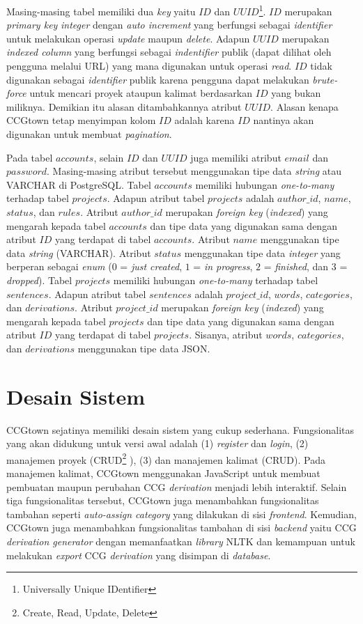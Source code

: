 Masing-masing tabel memiliki dua \textit{key} yaitu $ID$ dan
$UUID$\footnote{Universally Unique IDentifier}.
$ID$ merupakan \textit{primary key} \textit{integer} dengan \textit{auto increment}
yang berfungsi sebagai \textit{identifier} untuk melakukan operasi
\textit{update} maupun \textit{delete}.
Adapun $UUID$ merupakan \textit{indexed column} yang berfungsi sebagai
\textit{indentifier} publik (dapat dilihat oleh pengguna melalui URL)
yang mana digunakan untuk operasi \textit{read}.
$ID$ tidak digunakan sebagai \textit{identifier} publik karena pengguna dapat
melakukan \textit{brute-force} untuk mencari proyek ataupun kalimat berdasarkan
$ID$ yang bukan miliknya.
Demikian itu alasan ditambahkannya atribut $UUID$.
Alasan kenapa CCGtown tetap menyimpan kolom $ID$ adalah karena $ID$ nantinya akan
digunakan untuk membuat \textit{pagination}.

Pada tabel $accounts$, selain $ID$ dan $UUID$ juga memiliki atribut $email$ dan
$password$. Masing-masing atribut tersebut menggunakan tipe data \textit{string}
atau VARCHAR di PostgreSQL.
Tabel $accounts$ memiliki hubungan \textit{one-to-many} terhadap tabel $projects$.
Adapun atribut tabel $projects$ adalah $author\_id$, $name$, $status$, dan $rules$.
Atribut $author\_id$ merupakan \textit{foreign key} (\textit{indexed}) yang
mengarah kepada tabel $accounts$ dan tipe data yang digunakan sama dengan
atribut $ID$ yang terdapat di tabel $accounts$.
Atribut $name$ menggunakan tipe data \textit{string} (VARCHAR).
Atribut $status$ menggunakan tipe data \textit{integer} yang berperan sebagai
\textit{enum} ($0$ = \textit{just created}, $1$ = \textit{in progress},
$2$ = \textit{finished}, dan $3$ = \textit{dropped}).
Tabel $projects$ memiliki hubungan \textit{one-to-many} terhadap tabel $sentences$.
Adapun atribut tabel $sentences$ adalah $project\_id$, $words$, $categories$, dan
$derivations$. Atribut $project\_id$ merupakan \textit{foreign key}
(\textit{indexed}) yang mengarah kepada tabel $projects$ dan tipe data yang digunakan
sama dengan atribut $ID$ yang terdapat di tabel $projects$.
Sisanya, atribut $words$, $categories$, dan $derivations$ menggunakan tipe data JSON.


\section{Desain Sistem}
CCGtown sejatinya memiliki desain sistem yang cukup sederhana.
Fungsionalitas yang akan didukung untuk versi awal adalah (1) \textit{register} dan
\textit{login}, (2) manajemen proyek (CRUD\footnote{Create, Read, Update, Delete}
), (3) dan manajemen kalimat (CRUD).
Pada manajemen kalimat, CCGtown menggunakan JavaScript untuk membuat pembuatan
maupun perubahan CCG \textit{derivation} menjadi lebih interaktif.
Selain tiga fungsionalitas tersebut, CCGtown juga menambahkan fungsionalitas tambahan
seperti \textit{auto-assign category} yang dilakukan di sisi \textit{frontend}.
Kemudian, CCGtown juga menambahkan fungsionalitas tambahan di sisi \textit{backend}
yaitu CCG \textit{derivation generator} dengan memanfaatkan \textit{library} NLTK
dan kemampuan untuk melakukan \textit{export} CCG \textit{derivation} yang disimpan
di \textit{database}.

